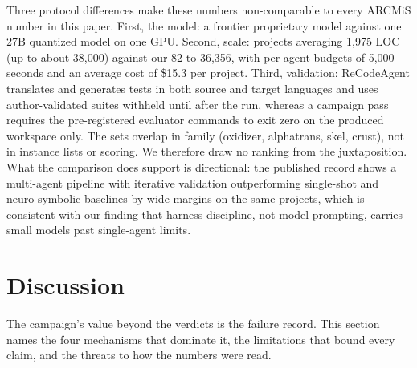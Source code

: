\documentclass[11pt]{article}
\begin{document}
Three protocol differences make these numbers non-comparable to every
ARCMiS number in this paper. First, the model: a frontier proprietary
model against one 27B quantized model on one GPU. Second, scale:
projects averaging 1{,}975 LOC (up to about 38{,}000) against our
82 to 36{,}356, with per-agent budgets of 5{,}000 seconds and an
average cost of \$15.3 per project. Third, validation: ReCodeAgent
translates and generates tests in both source and target languages and
uses author-validated suites withheld until after the run, whereas a
campaign pass requires the pre-registered evaluator commands to exit
zero on the produced workspace only. The sets overlap in family
(oxidizer, alphatrans, skel, crust), not in instance lists or scoring.
We therefore draw no ranking from the juxtaposition. What the comparison
does support is directional: the published record shows a multi-agent
pipeline with iterative validation outperforming single-shot and
neuro-symbolic baselines by wide margins on the same projects, which is
consistent with our finding that harness discipline, not model
prompting, carries small models past single-agent limits.

\section{Discussion}
\label{sec:discussion}

The campaign's value beyond the verdicts is the failure record. This
section names the four mechanisms that dominate it, the limitations that
bound every claim, and the threats to how the numbers were read.
\end{document}
